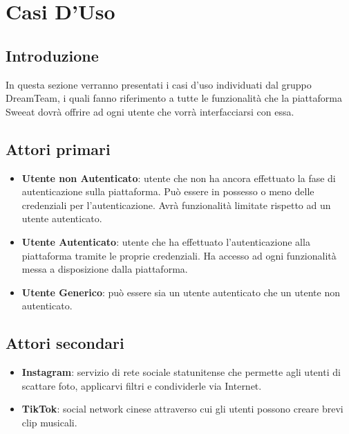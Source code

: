 \section{Casi D'Uso}
\subsection{Introduzione}
In questa sezione verranno presentati i casi d’uso individuati dal gruppo DreamTeam, i quali fanno riferimento a tutte le funzionalità che la piattaforma Sweeat dovrà offrire ad ogni utente che vorrà interfacciarsi con essa.
\subsection{Attori primari}
\begin{itemize}
    \item \textbf{Utente non Autenticato}: utente che non ha ancora effettuato la fase di autenticazione sulla piattaforma. Può essere in possesso o meno delle credenziali per l’autenticazione. Avrà funzionalità limitate rispetto ad un utente autenticato.
    \item \textbf{Utente Autenticato}: utente che ha effettuato l’autenticazione alla piattaforma tramite le proprie credenziali. Ha accesso ad ogni funzionalità messa a disposizione dalla piattaforma.
    \item \textbf{Utente Generico}: può essere sia un utente autenticato che un utente non autenticato.
\end{itemize}
\subsection{Attori secondari}
\begin{itemize}
    \item \textbf{Instagram}: servizio di rete sociale statunitense che permette agli utenti di scattare foto, applicarvi filtri e condividerle via Internet.
    \item \textbf{TikTok}: social network cinese attraverso cui gli utenti possono creare brevi clip musicali.
\end{itemize}
\clearpage 